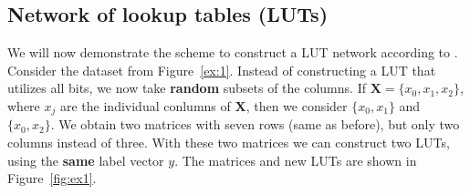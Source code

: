 \subsection{Network of lookup tables (LUTs)}
We will now demonstrate the scheme to construct a LUT network according to \cite{chatterjee2018learning}. Consider the dataset from Figure~\ref{ex:1}. Instead of constructing a LUT that utilizes all bits, we now take \textbf{random} subsets of the columns. If $\bm{X} = \{x_0,x_1,x_2\}$, where $x_j$ are the individual conlumns of $\bm{X}$, then we consider $\{x_0,x_1\}$ and $\{x_0,x_2\}$. We obtain two matrices with seven rows (same as before), but only two columns instead of three. With these two matrices we can construct two LUTs, using the \textbf{same} label vector $y$. The matrices and new LUTs are shown in Figure~\ref{fig:ex1}.

